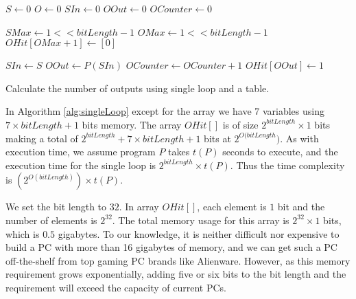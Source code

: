 \renewcommand{\algorithmiccomment}[1]{// #1}
\begin{algorithm}
\begin{algorithmic}

\STATE $S \leftarrow 0$
\STATE $O \leftarrow 0$
\STATE $SIn \leftarrow 0$
\STATE $OOut \leftarrow 0$
\STATE $OCounter \leftarrow 0$

\STATE $SMax \leftarrow 1 << bitLength - 1$
\STATE $OMax \leftarrow 1 << bitLength - 1$
\STATE $OHit[OMax + 1] \leftarrow [0]$

\STATE $SIn \leftarrow S$ 
\STATE $OOut \leftarrow P(SIn)$ 
\STATE $OCounter \leftarrow OCounter + 1$
\STATE $OHit[OOut] \leftarrow 1$
\ENDIF
\ENDFOR

\end{algorithmic}

\caption[Single loop]{Calculate the number of outputs using single loop and a table.}
\label{alg:singleLoop}
\end{algorithm}

In Algorithm \ref{alg:singleLoop} except for the array we have 7 variables using $7 \times bitLength + 1$ bits memory. The array $OHit[]$ is of size $2^{bitLength} \times 1$ bits making a total of $2^{bitLength} + 7 \times bitLength + 1$ bits at $2^{O(bitLength})$. As with execution time, we assume program $P$ takes $t(P)$ seconds to execute, and the execution time for the single loop is $2^{bitLength} \times t(P)$. Thus the time complexity is $(2^{O(bitLength)}) \times t(P)$.

We set the bit length to $32$. In array $OHit[]$, each element is $1$ bit and the number of elements is $2^{32}$. The total memory usage for this array is $2^{32} \times 1$ bits, which is $0.5$ gigabytes. To our knowledge, it is neither difficult nor expensive to build a PC with more than 16 gigabytes of memory, and we can get such a PC off-the-shelf from top gaming PC brands like Alienware. However, as this memory requirement grows exponentially, adding five or six bits to the bit length and the requirement will exceed the capacity of current PCs.